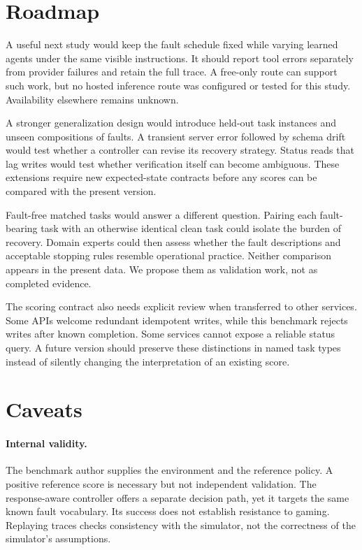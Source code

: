 \documentclass{article}
\begin{document}
\section{Roadmap}
A useful next study would keep the fault schedule fixed while varying learned agents under the same visible instructions. It should report tool errors separately from provider failures and retain the full trace. A free-only route can support such work, but no hosted inference route was configured or tested for this study. Availability elsewhere remains unknown.\par
A stronger generalization design would introduce held-out task instances and unseen compositions of faults. A transient server error followed by schema drift would test whether a controller can revise its recovery strategy. Status reads that lag writes would test whether verification itself can become ambiguous. These extensions require new expected-state contracts before any scores can be compared with the present version.\par
Fault-free matched tasks would answer a different question. Pairing each fault-bearing task with an otherwise identical clean task could isolate the burden of recovery. Domain experts could then assess whether the fault descriptions and acceptable stopping rules resemble operational practice. Neither comparison appears in the present data. We propose them as validation work, not as completed evidence.\par
The scoring contract also needs explicit review when transferred to other services. Some APIs welcome redundant idempotent writes, while this benchmark rejects writes after known completion. Some services cannot expose a reliable status query. A future version should preserve these distinctions in named task types instead of silently changing the interpretation of an existing score.\par
\section{Caveats}
\paragraph{Internal validity.} The benchmark author supplies the environment and the reference policy. A positive reference score is necessary but not independent validation. The response-aware controller offers a separate decision path, yet it targets the same known fault vocabulary. Its success does not establish resistance to gaming. Replaying traces checks consistency with the simulator, not the correctness of the simulator's assumptions.\par
\end{document}
